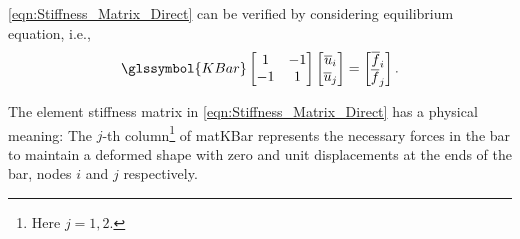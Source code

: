 \begin{remark}
	\cref{eqn:Stiffness_Matrix_Direct} can be verified by considering equilibrium equation, i.e.,
	\begin{equation}	\label{eqn:Stiffness_Matrix_Direct_Verify}
		\glssymbol{KBar}
		\begin{bmatrix}
			1		&		-1	\\
			-1	&		 1
		\end{bmatrix}
		\begin{bmatrix}
			\overline{u}_i \\
			\overline{u}_j
		\end{bmatrix} =
		\begin{bmatrix}
			\overline{f}_i \\
			\overline{f}_j
		\end{bmatrix}.
	\end{equation}
\end{remark}
\begin{remark}
	The element stiffness matrix in \cref{eqn:Stiffness_Matrix_Direct} has a physical meaning: The $j$-th
	column\footnote{Here $j = 1, 2$.} of \gls{matKBar} represents the necessary forces in the bar to maintain a deformed shape
	with zero and unit displacements at the ends of the bar, nodes $i$ and $j$ respectively.
\end{remark}
%
